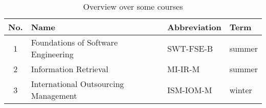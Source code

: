 \begin{table}[h]
	\centering
	\begin{tabular}{clll}
	\toprule
	No. & Name & Abbreviation & Term \\
	\midrule
	1 & Foundations of Software Engineering & SWT-FSE-B & summer \\
	2 & Information Retrieval & MI-IR-M & summer \\
	3 & International Outsourcing Management & ISM-IOM-M & winter \\		
	\bottomrule
	\end{tabular}
	\caption{Overview over some courses}
\end{table}